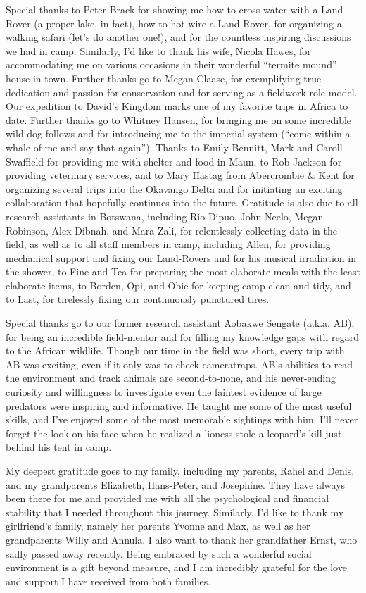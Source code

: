 \documentclass[../FinalThesis.tex]{subfiles}
\begin{document}
Special thanks to Peter Brack for showing me how to cross water with a Land
Rover (a proper lake, in fact), how to hot-wire a Land Rover, for organizing a
walking safari (let's do another one!), and for the countless inspiring
discussions we had in camp. Similarly, I'd like to thank his wife, Nicola Hawes,
for accommodating me on various occasions in their wonderful ``termite mound''
house in town. Further thanks go to Megan Claase, for exemplifying true
dedication and passion for conservation and for serving as a fieldwork role
model. Our expedition to David's Kingdom marks one of my favorite trips in
Africa to date. Further thanks go to Whitney Hansen, for bringing me on some
incredible wild dog follows and for introducing me to the imperial system
(``come within a whale of me and say that again''). Thanks to Emily Bennitt,
Mark and Caroll Swaffield for providing me with shelter and food in Maun, to Rob
Jackson for providing veterinary services, and to Mary Hastag from Abercrombie
\& Kent for organizing several trips into the Okavango Delta and for initiating
an exciting collaboration that hopefully continues into the future. Gratitude is
also due to all research assistants in Botswana, including Rio Dipuo, John
Neelo, Megan Robinson, Alex Dibnah, and Mara Zali, for relentlessly collecting
data in the field, as well as to all staff members in camp, including Allen, for
providing mechanical support and fixing our Land-Rovers and for his musical
irradiation in the shower, to Fine and Tea for preparing the most elaborate
meals with the least elaborate items, to Borden, Opi, and Obie for keeping camp
clean and tidy, and to Last, for tirelessly fixing our continuously punctured
tires.

Special thanks go to our former research assistant Aobakwe Sengate (a.k.a. AB),
for being an incredible field-mentor and for filling my knowledge gaps with
regard to the African wildlife. Though our time in the field was short, every
trip with AB was exciting, even if it only was to check cameratraps. AB's
abilities to read the environment and track animals are second-to-none, and his
never-ending curiosity and willingness to investigate even the faintest evidence
of large predators were inspiring and informative. He taught me some of the most
useful skills, and I've enjoyed some of the most memorable sightings with him.
I'll never forget the look on his face when he realized a lioness stole a
leopard's kill just behind his tent in camp.

My deepest gratitude goes to my family, including my parents, Rahel and Denis,
and my grandparents Elizabeth, Hans-Peter, and Josephine. They have always been
there for me and provided me with all the psychological and financial stability
that I needed throughout this journey. Similarly, I'd like to thank my
girlfriend's family, namely her parents Yvonne and Max, as well as her
grandparents Willy and Annula. I also want to thank her grandfather Ernst, who
sadly passed away recently. Being embraced by such a wonderful social
environment is a gift beyond measure, and I am incredibly grateful for the love
and support I have received from both families.
\end{document}

